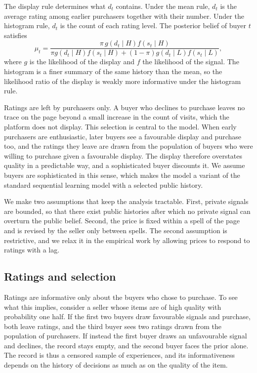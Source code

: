 \documentclass[12pt]{article}
\begin{document}
The display rule determines what $d_t$ contains. Under the mean rule, $d_t$ is the average rating among earlier purchasers together with their number. Under the histogram rule, $d_t$ is the count of each rating level. The posterior belief of buyer $t$ satisfies
\begin{equation}
\mu_t = \frac{\pi \, g(d_t \mid H) f(s_t \mid H)}{\pi g(d_t \mid H) f(s_t \mid H) + (1-\pi) g(d_t \mid L) f(s_t \mid L)} , \label{eq:posterior}
\end{equation}
where $g$ is the likelihood of the display and $f$ the likelihood of the signal. The histogram is a finer summary of the same history than the mean, so the likelihood ratio of the display is weakly more informative under the histogram rule.

Ratings are left by purchasers only. A buyer who declines to purchase leaves no trace on the page beyond a small increase in the count of visits, which the platform does not display. This selection is central to the model. When early purchasers are enthusiastic, later buyers see a favourable display and purchase too, and the ratings they leave are drawn from the population of buyers who were willing to purchase given a favourable display. The display therefore overstates quality in a predictable way, and a sophisticated buyer discounts it. We assume buyers are sophisticated in this sense, which makes the model a variant of the standard sequential learning model with a selected public history.

We make two assumptions that keep the analysis tractable. First, private signals are bounded, so that there exist public histories after which no private signal can overturn the public belief. Second, the price is fixed within a spell of the page and is revised by the seller only between spells. The second assumption is restrictive, and we relax it in the empirical work by allowing prices to respond to ratings with a lag.

\subsection{Ratings and selection}
Ratings are informative only about the buyers who chose to purchase. To see what this implies, consider a seller whose items are of high quality with probability one half. If the first two buyers draw favourable signals and purchase, both leave ratings, and the third buyer sees two ratings drawn from the population of purchasers. If instead the first buyer draws an unfavourable signal and declines, the record stays empty, and the second buyer faces the prior alone. The record is thus a censored sample of experiences, and its informativeness depends on the history of decisions as much as on the quality of the item.
\end{document}

